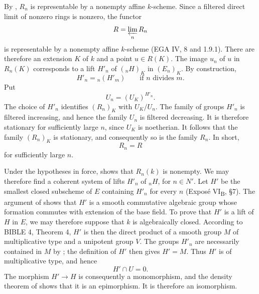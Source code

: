 

By , \(R_n\) is representable by a nonempty affine
\(k\)-scheme.  Since a filtered direct limit of nonzero rings is
nonzero, the functor
\[
  R=\varprojlim_n R_n
\]
is representable by a nonempty affine \(k\)-scheme
(EGA IV, 8 and 1.9.1).  There are therefore an extension \(K\) of
\(k\) and a point \(u\in R(K)\).  The image \(u_n\) of \(u\) in
\(R_n(K)\) corresponds to a lift \(H'_n\) of \(({}_nH)_K\) in
\((E_n)_K\).  By construction,
\[
  H'_n={}_n(H'_m)\qquad\text{if \(n\) divides \(m\)}.
\]
Put
\[
  U_n=(U_K)^{H'_n}.
\]
The choice of \(H'_n\) identifies \((R_n)_K\) with \(U_K/U_n\).
The family of groups \(H'_n\) is filtered increasing, and hence
the family \(U_n\) is filtered decreasing.  It is therefore
stationary for sufficiently large \(n\), since \(U_K\) is
noetherian.  It follows that the family \((R_n)_K\) is stationary,
and consequently so is the family \(R_n\).  In short,
\[
  R_n=R
\]
for sufficiently large \(n\).

Under the hypotheses in force,  shows that \(R_n(k)\) is
nonempty.  We may therefore find a coherent system of lifts
\(H'_n\) of \({}_nH\), for \(n\in N'\).  Let \(H'\) be the
smallest closed subscheme of \(E\) containing \(H'_n\) for every
\(n\) (Exposé VI\textsubscript{B}, \S7).  The argument of
 shows that \(H'\) is a smooth commutative
algebraic group whose formation commutes with extension of the
base field.  To prove that \(H'\) is a lift of \(H\) in \(E\), we
may therefore suppose that \(k\) is algebraically closed.
According to BIBLE 4, Theorem 4, \(H'\) is then the direct product
of a smooth group \(M\) of multiplicative type and a unipotent
group \(V\).  The groups \(H'_n\) are necessarily contained in
\(M\) by ; the definition of \(H'\) then gives \(H'=M\).
Thus \(H'\) is of multiplicative type, and hence
\[
  H'\cap U=0.
\]
The morphism \(H'\to H\) is consequently a monomorphism, and the
density theorem of  shows that it is an
epimorphism.  It is therefore an isomorphism.

